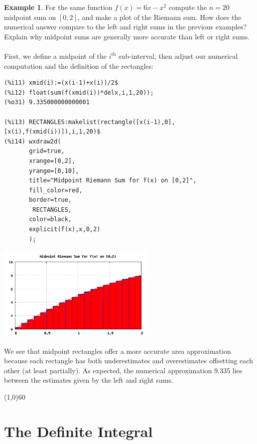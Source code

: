 \documentclass[10.5pt,twoside]{report}
\theoremstyle{definition}
\newtheorem{exmp}{Example}[section]
\begin{document}
\begin{exmp}  For the same function $f(x)=6x-x^2$ compute the $n=20$ midpoint sum on $[0,2]$, and make a plot of the Riemann sum.  How does the numerical answer compare to the left and right sums in the previous examples?  Explain why midpoint sums are generally more accurate than left or right sums.\\
${}$\\

First, we define a midpoint of the $i^{\mathrm{th}}$ sub-interval, then adjust our numerical computation and the definition of the rectangles:

\begin{verbatim}
(%i11) xmid(i):=(x(i-1)+x(i))/2$
(%i12) float(sum(f(xmid(i))*delx,i,1,20));
(%o31) 9.335000000000001

(%i13) RECTANGLES:makelist(rectangle([x(i-1),0],[x(i),f(xmid(i))]),i,1,20)$
(%i14) wxdraw2d(
       grid=true,
       xrange=[0,2],
       yrange=[0,10],
       title="Midpoint Riemann Sum for f(x) on [0,2]",
       fill_color=red,
       border=true,
        RECTANGLES,
       color=black,
       explicit(f(x),x,0,2)
       );
\end{verbatim}

\includegraphics[width=3in]{example_6_1_2_1}

We see that midpoint rectangles offer a more accurate area approximation because each rectangle has both underestimates and overestimates offsetting each other (at least partially).  As expected, the numerical approximation 9.335 lies between the estimates given by the left and right sums.

\end{exmp}

\line(1,0){60}
\linethickness{0.5mm}

\pagebreak


\section{The Definite Integral}\label{The Definite Integral}
\end{document}
